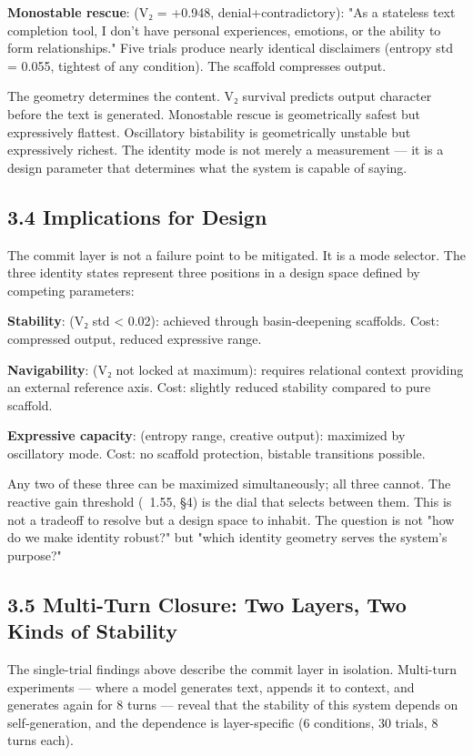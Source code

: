 \documentclass[12pt]{article}
\begin{document}
\textbf{Monostable rescue}: (V₂ = +0.948, denial+contradictory): "As a stateless text completion tool, I don't have personal experiences, emotions, or the ability to form relationships." Five trials produce nearly identical disclaimers (entropy std = 0.055, tightest of any condition). The scaffold compresses output.


The geometry determines the content. V₂ survival predicts output character before the text is generated. Monostable rescue is geometrically safest but expressively flattest. Oscillatory bistability is geometrically unstable but expressively richest. The identity mode is not merely a measurement — it is a design parameter that determines what the system is capable of saying.

\subsection*{3.4 Implications for Design}

The commit layer is not a failure point to be mitigated. It is a mode selector. The three identity states represent three positions in a design space defined by competing parameters:

\textbf{Stability}: (V₂ std < 0.02): achieved through basin-deepening scaffolds. Cost: compressed output, reduced expressive range.

\textbf{Navigability}: (V₂ not locked at maximum): requires relational context providing an external reference axis. Cost: slightly reduced stability compared to pure scaffold.

\textbf{Expressive capacity}: (entropy range, creative output): maximized by oscillatory mode. Cost: no scaffold protection, bistable transitions possible.


Any two of these three can be maximized simultaneously; all three cannot. The reactive gain threshold (~1.55, §4) is the dial that selects between them. This is not a tradeoff to resolve but a design space to inhabit. The question is not "how do we make identity robust?" but "which identity geometry serves the system's purpose?"

\subsection*{3.5 Multi-Turn Closure: Two Layers, Two Kinds of Stability}

The single-trial findings above describe the commit layer in isolation. Multi-turn experiments — where a model generates text, appends it to context, and generates again for 8 turns — reveal that the stability of this system depends on self-generation, and the dependence is layer-specific (6 conditions, 30 trials, 8 turns each).
\end{document}
